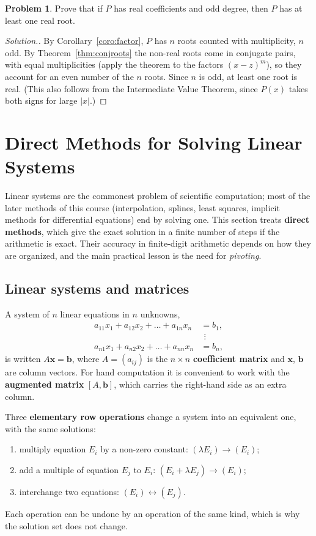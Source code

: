 \documentclass[11pt,a4paper]{article}
\numberwithin{equation}{section}
\theoremstyle{definition}
\newtheorem{problemx}{Problem}[subsection]
\newenvironment{problem}{\begin{problemx}}{\end{problemx}}
\newenvironment{solution}
  {\renewcommand{\qedsymbol}{}\begin{proof}[\textit{Solution}.]}
  {\end{proof}}
\begin{document}
\begin{problem}
Prove that if $P$ has real coefficients and odd degree, then $P$ has at least one real root.
\end{problem}
\begin{solution}
By Corollary~\ref{coro:factor}, $P$ has $n$ roots counted with multiplicity, $n$ odd. By Theorem~\ref{thm:conjroots} the non-real roots come in
conjugate pairs, with equal multiplicities (apply the theorem to the factors $(x-z)^m$), so they account for an even number of the $n$
roots. Since $n$ is odd, at least one root is real. (This also follows from the Intermediate Value Theorem, since $P(x)$ takes both signs
for large $|x|$.)
\end{solution}


\section{Direct Methods for Solving Linear Systems}
\label{sec:linsys}

Linear systems are the commonest problem of scientific computation; most of the later methods of this course (interpolation, splines,
least squares, implicit methods for differential equations) end by solving one. This section treats \textbf{direct methods}, which give the
exact solution in a finite number of steps if the arithmetic is exact. Their accuracy in finite-digit arithmetic depends on how they are
organized, and the main practical lesson is the need for \emph{pivoting}.


\subsection{Linear systems and matrices}
\label{sec:matrices}

A system of $n$ linear equations in $n$ unknowns,
\begin{align*}
a_{11}x_1+a_{12}x_2+\dots+a_{1n}x_n &= b_1,\\
&\ \,\vdots\\
a_{n1}x_1+a_{n2}x_2+\dots+a_{nn}x_n &= b_n,
\end{align*}
is written $A\mathbf x = \mathbf b$, where $A = (a_{ij})$ is the $n\times n$ \textbf{coefficient matrix} and $\mathbf x$, $\mathbf b$ are column
vectors. For hand computation it is convenient to work with the \textbf{augmented matrix} $[A,\mathbf b]$, which carries the right-hand side
as an extra column.

Three \textbf{elementary row operations} change a system into an equivalent one, with the same solutions:
\begin{enumerate}
\item[(i)] multiply equation $E_i$ by a non-zero constant: $(\lambda E_i)\to(E_i)$;
\item[(ii)] add a multiple of equation $E_j$ to $E_i$: $(E_i+\lambda E_j)\to(E_i)$;
\item[(iii)] interchange two equations: $(E_i)\leftrightarrow(E_j)$.
\end{enumerate}
Each operation can be undone by an operation of the same kind, which is why the solution set does not change.
\end{document}
